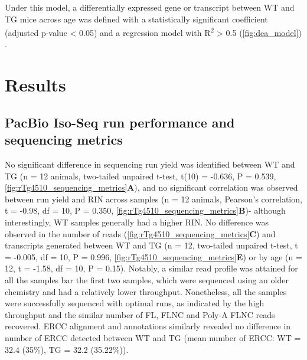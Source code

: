 Under this model, a differentially expressed gene or transcript between WT and TG mice across age was defined with a statistically significant coefficient (adjusted p-value < 0.05) and a regression model with R\textsuperscript{2} > 0.5  (\cref{fig:dea_model}) .


\clearpage 
\section{Results}
\subsection{PacBio Iso-Seq run performance and sequencing metrics}
No significant difference in sequencing run yield was identified between WT and TG (n = 12 animals, two-tailed unpaired t-test, t(10) = -0.636, P = 0.539, \cref{fig:rTg4510_sequencing_metrics}\textbf{A}), and no significant correlation was observed between run yield and RIN across samples (n = 12 animals, Pearson's correlation, t = -0.98, df = 10, P = 0.350, \cref{fig:rTg4510_sequencing_metrics}\textbf{B})- although interestingly, WT samples generally had a higher RIN. No difference was observed in the number of reads (\cref{fig:rTg4510_sequencing_metrics}\textbf{C}) and transcripts generated between WT and TG (n = 12, two-tailed unpaired t-test, t = -0.005, df = 10, P = 0.996, \cref{fig:rTg4510_sequencing_metrics}\textbf{E}) or by age (n = 12, t = -1.58, df = 10, P = 0.15). Notably, a similar read profile was attained for all the samples bar the first two samples, which were sequenced using an older chemistry and had a relatively lower throughput. Nonetheless, all the samples were successfully sequenced with optimal runs, as indicated by the high throughput and the similar number of FL, FLNC and Poly-A FLNC reads recovered. ERCC alignment and annotations similarly revealed no difference in number of ERCC detected between WT and TG (mean number of ERCC: WT = 32.4 (35\%), TG = 32.2 (35.22\%)). 

